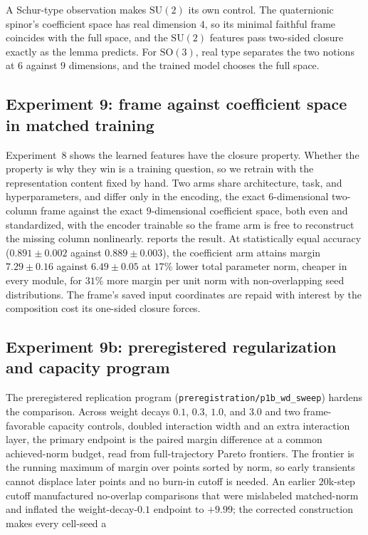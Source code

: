 \documentclass{article}
\newcommand{\SU}{\mathrm{SU}}
\newcommand{\SO}{\mathrm{SO}}
\begin{document}
A Schur-type observation makes $\SU(2)$ its own control. The
quaternionic spinor's coefficient space has real dimension $4$, so
its minimal faithful frame coincides with the full space, and the
$\SU(2)$ features pass two-sided closure exactly as the lemma
predicts. For $\SO(3)$, real type separates the two notions at $6$
against $9$ dimensions, and the trained model chooses the full space.

\subsection{Experiment 9: frame against coefficient space in matched
training}

Experiment~8 shows the learned features have the closure property.
Whether the property is why they win is a training question, so we
retrain with the representation content fixed by hand. Two arms share
architecture, task, and hyperparameters, and differ only in the
encoding, the exact $6$-dimensional two-column frame against the
exact $9$-dimensional coefficient space, both even and standardized,
with the encoder trainable so the frame arm is free to reconstruct
the missing column nonlinearly.  reports the result.
At statistically equal accuracy ($0.891 \pm 0.002$ against
$0.889 \pm 0.003$), the coefficient arm attains margin
$7.29 \pm 0.16$ against $6.49 \pm 0.05$ at $17\%$ lower total
parameter norm, cheaper in every module, for $31\%$ more margin per
unit norm with non-overlapping seed distributions. The frame's saved
input coordinates are repaid with interest by the composition cost
its one-sided closure forces. \subsection*{Experiment 9b: preregistered regularization and capacity
program} The preregistered replication program
(\texttt{preregistration/p1b\_wd\_sweep}) hardens the comparison. Across
weight decays $0.1$, $0.3$, $1.0$, and $3.0$ and two frame-favorable
capacity controls, doubled interaction width and an extra interaction
layer, the primary endpoint is the paired margin difference at a common
achieved-norm budget, read from full-trajectory Pareto frontiers. The
frontier is the running maximum of margin over points sorted by norm, so
early transients cannot displace later points and no burn-in cutoff is
needed. An earlier $20$k-step cutoff manufactured no-overlap comparisons
that were mislabeled matched-norm and inflated the weight-decay-$0.1$
endpoint to $+9.99$; the corrected construction makes every cell-seed a
\end{document}

